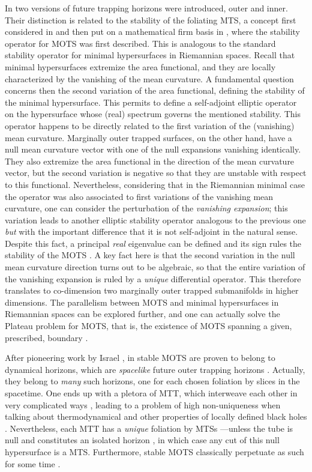 \documentclass[12pt]{iopart}
\begin{document}
In \cite{Hay} two versions of future trapping horizons were introduced, outer and inner. Their distinction is related to the stability of the foliating MTS, a concept first considered in \cite{Ne3} and then put on a mathematical firm basis in \cite{AMS,AMS1}, where the stability operator for MOTS was first described. This is analogous to the standard stability operator for minimal hypersurfaces in Riemannian spaces. Recall that minimal hypersurfaces extremize the area functional, and they are locally characterized by the vanishing of the mean curvature. A fundamental question concerns then the second variation of the area functional, defining the stability of the minimal hypersurface. This permits to define a self-adjoint elliptic operator on the hypersurface whose (real) spectrum governs the mentioned stability. This operator happens to be directly related to the first variation of the (vanishing) mean curvature. Marginally outer trapped surfaces, on the other hand, have a null mean curvature vector with one of the null expansions vanishing identically. They also extremize the area functional in the direction of the mean curvature vector, but the second variation is negative so that they are unstable with respect to this functional. Nevertheless, considering that in the Riemannian minimal case the operator was also associated to first variations of the vanishing mean curvature, one can consider the perturbation of the {\em vanishing expansion}; this variation leads to another elliptic stability operator analogous to the previous one {\em but} with the important difference that it is not self-adjoint in the natural sense. Despite this fact, a principal {\em real} eigenvalue can be defined and its sign rules the stability of the MOTS \cite{AMS}. A key fact here is that the second variation in the null mean curvature direction turns out to be algebraic, so that the entire variation of the vanishing expansion is ruled by a {\em unique} differential operator. This therefore translates to co-dimension two marginally outer trapped submanifolds in higher dimensions. The parallelism between MOTS and minimal hypersurfaces in Riemannian spaces can be explored further, and one can actually solve the Plateau problem for MOTS, that is, the existence of MOTS spanning a given, prescribed, boundary \cite{eichmair}.

After pioneering work by Israel \cite{Isr}, in \cite{AMS} stable MOTS are proven to belong to dynamical horizons, which are {\em spacelike} future outer trapping horizons \cite{AK,Jara}. Actually, they belong to {\em many} such horizons, one for each chosen foliation by slices in the spacetime. One ends up with a pletora of MTT, which interweave each other in very complicated ways \cite{AG}, leading to a problem of high non-uniqueness when talking about thermodynamical and other properties of locally defined black holes \cite{AK,AG,BeS,Booth}. Nevertheless, each MTT has a {\em unique} foliation by MTSs \cite{AG} ---unless the tube is null and constitutes an isolated horizon \cite{AK}, in which case any cut of this null hypersurface is a MTS. Furthermore, stable MOTS classically perpetuate as such for some time \cite{AMMS}.
\end{document}
